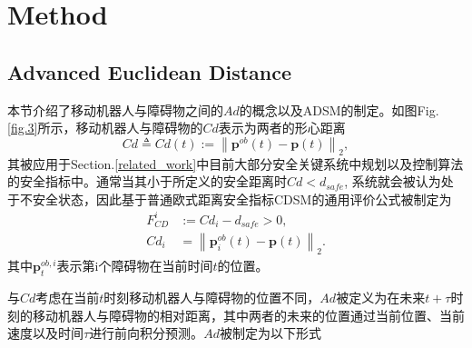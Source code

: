 \documentclass[preprint,5p,times,twocolumn]{elsarticle}
\begin{document}
\section{Method}
\label{method}

\subsection{Advanced Euclidean Distance}
\label{AED-section}

本节介绍了移动机器人与障碍物之间的$Ad$的概念以及ADSM的制定。如图Fig.\ref{fig.3}所示，移动机器人与障碍物的$Cd$表示为两者的形心距离
\begin{equation}
\label{eq.CED}
Cd \triangleq Cd(t) := \left\|\boldsymbol{p}^{ob}(t)-\boldsymbol{p}(t)\right\|_2,
\end{equation}
其被应用于Section.\ref{related_work}中目前大部分安全关键系统中规划以及控制算法的安全指标中。通常当其小于所定义的安全距离时$Cd<d_{safe}$, 系统就会被认为处于不安全状态，因此基于普通欧式距离安全指标CDSM的通用评价公式被制定为
\begin{equation}
\begin{aligned}
\label{eq.security certificate1}
F_{CD}^i&:=Cd_i-d_{safe}>0,\\
Cd_i&=\left\|\boldsymbol{p}^{ob}_i(t)-\boldsymbol{p}(t)\right\|_2.
\end{aligned}
\end{equation}
其中$\boldsymbol{p}^{ob,i}_t$表示第i个障碍物在当前时间$t$的位置。

与$Cd$考虑在当前$t$时刻移动机器人与障碍物的位置不同，$Ad$被定义为在未来$t+\tau$时刻的移动机器人与障碍物的相对距离，其中两者的未来的位置通过当前位置、当前速度以及时间$\tau$进行前向积分预测。$Ad$被制定为以下形式
\end{document}
